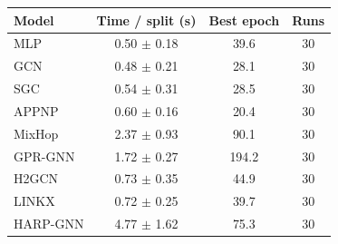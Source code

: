 \begin{tabular}{lccc}
\toprule
Model & Time / split (s) & Best epoch & Runs \\
\midrule
MLP & 0.50 $\pm$ 0.18 & 39.6 & 30 \\
GCN & 0.48 $\pm$ 0.21 & 28.1 & 30 \\
SGC & 0.54 $\pm$ 0.31 & 28.5 & 30 \\
APPNP & 0.60 $\pm$ 0.16 & 20.4 & 30 \\
MixHop & 2.37 $\pm$ 0.93 & 90.1 & 30 \\
GPR-GNN & 1.72 $\pm$ 0.27 & 194.2 & 30 \\
H2GCN & 0.73 $\pm$ 0.35 & 44.9 & 30 \\
LINKX & 0.72 $\pm$ 0.25 & 39.7 & 30 \\
HARP-GNN & 4.77 $\pm$ 1.62 & 75.3 & 30 \\
\bottomrule
\end{tabular}
